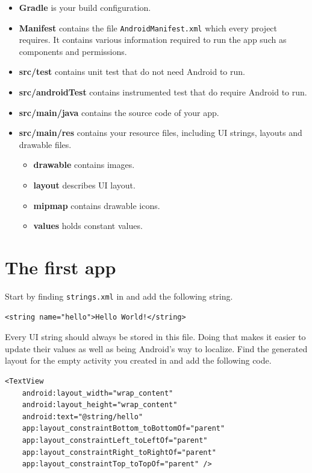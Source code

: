\begin{itemize}
\item \textbf{Gradle} is your build configuration.
\item \textbf{Manifest} contains the file \verb!AndroidManifest.xml! which every project requires. It contains various information required to run the app such as components and permissions.
\item \textbf{src/test} contains unit test that do not need Android to run.
\item \textbf{src/androidTest} contains instrumented test that do require Android to run.
\item \textbf{src/main/java} contains the source code of your app.
\item \textbf{src/main/res} contains your resource files, including UI strings, layouts and drawable files. 
  \begin{itemize}
      \item \textbf{drawable} contains images.
      \item \textbf{layout} describes UI layout.
      \item \textbf{mipmap} contains drawable icons.
      \item \textbf{values} holds constant values.
  \end{itemize}
\end{itemize}

\section{The first app}
Start by finding \verb!strings.xml! in  and add the following string.
\begin{lstlisting}[style=A_XML]
<string name="hello">Hello World!</string>
\end{lstlisting}
Every UI string should always be stored in this file. Doing that makes it easier to update their values as well as being Android's way to localize. Find the generated layout for the empty activity you created in  and add the following code.
\begin{lstlisting}[style=A_XML, caption={Hello World view}, label = {listing:hwv}]
<TextView
    android:layout_width="wrap_content"
    android:layout_height="wrap_content"
    android:text="@string/hello"
    app:layout_constraintBottom_toBottomOf="parent"
    app:layout_constraintLeft_toLeftOf="parent"
    app:layout_constraintRight_toRightOf="parent"
    app:layout_constraintTop_toTopOf="parent" />
\end{lstlisting}

